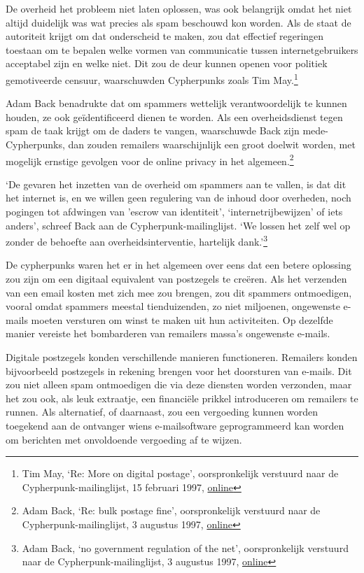 \documentclass[
  a5paper,
  smalldemyvopaper,11pt,twoside,onecolumn,openright,extrafontsizes]{memoir}
\begin{document}
De overheid het probleem niet laten oplossen, was ook belangrijk omdat
het niet altijd duidelijk was wat precies als spam beschouwd kon worden.
Als de staat de autoriteit krijgt om dat onderscheid te maken, zou dat
effectief regeringen toestaan om te bepalen welke vormen van
communicatie tussen internetgebruikers acceptabel zijn en welke niet.
Dit zou de deur kunnen openen voor politiek gemotiveerde censuur,
waarschuwden Cypherpunks zoals Tim May.\footnote{Tim May, `Re: More on
  digital postage', oorspronkelijk verstuurd naar de
  Cypherpunk-mailinglijst, 15 februari 1997,
  \href{https://cypherpunks.venona.com/date/1997/02/msg02295.h}{online}}

Adam Back benadrukte dat om spammers wettelijk verantwoordelijk te
kunnen houden, ze ook geïdentificeerd dienen te worden. Als een
overheidsdienst tegen spam de taak krijgt om de daders te vangen,
waarschuwde Back zijn mede-Cypherpunks, dan zouden remailers
waarschijnlijk een groot doelwit worden, met mogelijk ernstige gevolgen
voor de online privacy in het algemeen.\footnote{Adam Back, `Re: bulk
  postage fine', oorspronkelijk verstuurd naar de
  Cypherpunk-mailinglijst, 3 augustus 1997,
  \href{https://cypherpunks.venona.com/date/1997/08/msg00070.html}{online}}

`De gevaren het inzetten van de overheid om spammers aan te vallen, is
dat dit het internet is, en we willen geen regulering van de inhoud door
overheden, noch pogingen tot afdwingen van 'escrow van identiteit',
`internetrijbewijzen' of iets anders', schreef Back aan de
Cypherpunk-mailinglijst. `We lossen het zelf wel op zonder de behoefte
aan overheidsinterventie, hartelijk dank.'\footnote{Adam Back, `no
  government regulation of the net', oorspronkelijk verstuurd naar de
  Cypherpunk-mailinglijst, 3 augustus 1997,
  \href{https://cypherpunks.venona.com/date/1997/08/msg00087.html}{online}}

De cypherpunks waren het er in het algemeen over eens dat een betere
oplossing zou zijn om een digitaal equivalent van postzegels te creëren.
Als het verzenden van een email kosten met zich mee zou brengen, zou dit
spammers ontmoedigen, vooral omdat spammers meestal tienduizenden, zo
niet miljoenen, ongewenste e-mails moeten versturen om winst te maken
uit hun activiteiten. Op dezelfde manier vereiste het bombarderen van
remailers massa's ongewenste e-mails.

Digitale postzegels konden verschillende manieren functioneren.
Remailers konden bijvoorbeeld postzegels in rekening brengen voor het
doorsturen van e-mails. Dit zou niet alleen spam ontmoedigen die via
deze diensten worden verzonden, maar het zou ook, als leuk extraatje,
een financiële prikkel introduceren om remailers te runnen. Als
alternatief, of daarnaast, zou een vergoeding kunnen worden toegekend
aan de ontvanger wiens e-mailsoftware geprogrammeerd kan worden om
berichten met onvoldoende vergoeding af te wijzen.
\end{document}

